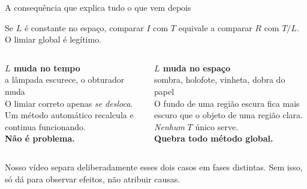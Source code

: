 \documentclass[aspectratio=169,12pt]{beamer}
\newcommand{\sub}[1]{{\small\textcolor{cinza}{#1}}}
\begin{document}
\begin{frame}{A consequência que explica tudo o que vem depois}

  Se $L$ é constante no espaço, comparar $I$ com $T$ equivale a comparar $R$
  com $T/L$. O limiar global é legítimo.

  \vspace{1em}
  \begin{columns}[T,onlytextwidth]
      \textbf{$L$ muda no \alert{tempo}}\\[.3em]
      \sub{a lâmpada escurece, o obturador muda}\\[.6em]
      O limiar correto apenas \emph{se desloca}. Um método automático
      recalcula e continua funcionando.\\[.5em]
      \textcolor{cAdapt}{\textbf{Não é problema.}}

      \textbf{$L$ muda no \alert{espaço}}\\[.3em]
      \sub{sombra, holofote, vinheta, dobra do papel}\\[.6em]
      O fundo de uma região escura fica mais escuro que o objeto de uma região
      clara. \emph{Nenhum} $T$ único serve.\\[.5em]
      \textcolor{cMulti}{\textbf{Quebra todo método global.}}
  \end{columns}

  \vspace{1em}
  \sub{Nosso vídeo separa deliberadamente esses dois casos em fases distintas.
  Sem isso, só dá para observar efeitos, não atribuir causas.}

\end{frame}
\end{document}
